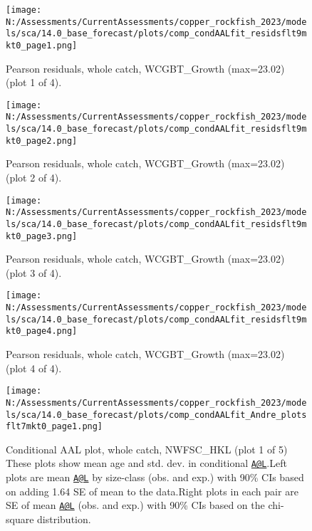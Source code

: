 \documentclass[11pt,
  english,
  letterpaper,
]{article}
\begin{document}
\begin{figure}
\centering
\texttt{[image: N:/Assessments/CurrentAssessments/copper\_rockfish\_2023/models/sca/14.0\_base\_forecast/plots/comp\_condAALfit\_residsflt9mkt0\_page1.png]}
\caption{Pearson residuals, whole catch, WCGBT\_Growth (max=23.02) (plot 1 of 4).\label{fig:comp_condAALfit_residsflt9mkt0_page1}}
\end{figure}

\begin{figure}
\centering
\texttt{[image: N:/Assessments/CurrentAssessments/copper\_rockfish\_2023/models/sca/14.0\_base\_forecast/plots/comp\_condAALfit\_residsflt9mkt0\_page2.png]}
\caption{Pearson residuals, whole catch, WCGBT\_Growth (max=23.02) (plot 2 of 4).\label{fig:comp_condAALfit_residsflt9mkt0_page2}}
\end{figure}

\begin{figure}
\centering
\texttt{[image: N:/Assessments/CurrentAssessments/copper\_rockfish\_2023/models/sca/14.0\_base\_forecast/plots/comp\_condAALfit\_residsflt9mkt0\_page3.png]}
\caption{Pearson residuals, whole catch, WCGBT\_Growth (max=23.02) (plot 3 of 4).\label{fig:comp_condAALfit_residsflt9mkt0_page3}}
\end{figure}

\begin{figure}
\centering
\texttt{[image: N:/Assessments/CurrentAssessments/copper\_rockfish\_2023/models/sca/14.0\_base\_forecast/plots/comp\_condAALfit\_residsflt9mkt0\_page4.png]}
\caption{Pearson residuals, whole catch, WCGBT\_Growth (max=23.02) (plot 4 of 4).\label{fig:comp_condAALfit_residsflt9mkt0_page4}}
\end{figure}

\begin{figure}
\centering
\texttt{[image: N:/Assessments/CurrentAssessments/copper\_rockfish\_2023/models/sca/14.0\_base\_forecast/plots/comp\_condAALfit\_Andre\_plotsflt7mkt0\_page1.png]}
\caption{Conditional AAL plot, whole catch, NWFSC\_HKL (plot 1 of 5) These plots show mean age and std. dev. in conditional \href{mailto:A@L}{\nolinkurl{A@L}}.Left plots are mean \href{mailto:A@L}{\nolinkurl{A@L}} by size-class (obs. and exp.) with 90\% CIs based on adding 1.64 SE of mean to the data.Right plots in each pair are SE of mean \href{mailto:A@L}{\nolinkurl{A@L}} (obs. and exp.) with 90\% CIs based on the chi-square distribution.\label{fig:comp_condAALfit_Andre_plotsflt7mkt0_page1}}
\end{figure}
\end{document}
